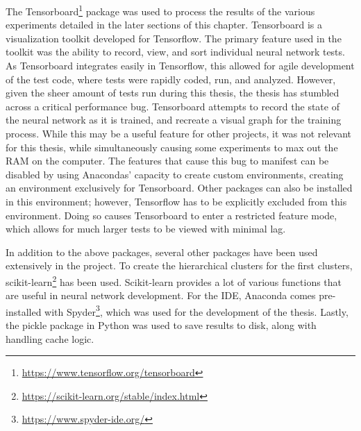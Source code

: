 

The Tensorboard\footnote{\url{https://www.tensorflow.org/tensorboard}} package was used to process the results of the various experiments detailed in the later sections of this chapter.
Tensorboard is a visualization toolkit developed for Tensorflow.
The primary feature used in the toolkit was the ability to record, view, and sort individual neural network tests.
As Tensorboard integrates easily in Tensorflow, this allowed for agile development of the test code, where tests were rapidly coded, run, and analyzed.
However, given the sheer amount of tests run during this thesis, the thesis has stumbled across a critical performance bug.
Tensorboard attempts to record the state of the neural network as it is trained, and recreate a visual graph for the training process.
While this may be a useful feature for other projects, it was not relevant for this thesis, while simultaneously causing some experiments to max out the RAM on the computer.
The features that cause this bug to manifest can be disabled by using Anacondas' capacity to create custom environments, creating an environment exclusively for Tensorboard.
Other packages can also be installed in this environment; however, Tensorflow has to be explicitly excluded from this environment.
Doing so causes Tensorboard to enter a restricted feature mode, which allows for much larger tests to be viewed with minimal lag.

In addition to the above packages, several other packages have been used extensively in the project.
To create the hierarchical clusters for the first clusters, scikit-learn\footnote{\url{https://scikit-learn.org/stable/index.html}} has been used.
Scikit-learn provides a lot of various functions that are useful in neural network development.
For the IDE, Anaconda comes pre-installed with Spyder\footnote{\url{https://www.spyder-ide.org/}}, which was used for the development of the thesis.
Lastly, the pickle package in Python was used to save results to disk, along with handling cache logic.


